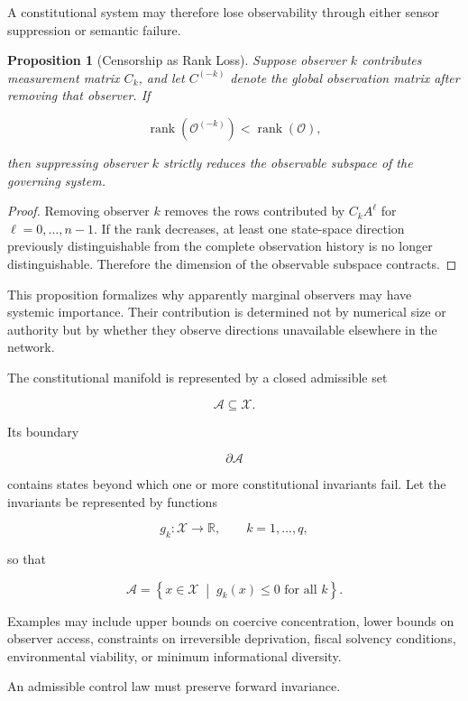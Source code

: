 \documentclass[12pt,a4paper]{article}
\newtheorem{proposition}{Proposition}
\DeclareMathOperator{\rank}{rank}
\begin{document}
A constitutional system may therefore lose observability through either sensor suppression or semantic failure.

\begin{proposition}[Censorship as Rank Loss]
Suppose observer \(k\) contributes measurement matrix \(C_k\), and let \(C^{(-k)}\) denote the global observation matrix after removing that observer. If

\[
\rank\left(\mathcal{O}^{(-k)}\right)
<
\rank\left(\mathcal{O}\right),
\]

then suppressing observer \(k\) strictly reduces the observable subspace of the governing system.
\end{proposition}

\begin{proof}
Removing observer \(k\) removes the rows contributed by \(C_kA^\ell\) for \(\ell=0,\dots,n-1\). If the rank decreases, at least one state-space direction previously distinguishable from the complete observation history is no longer distinguishable. Therefore the dimension of the observable subspace contracts.
\end{proof}

This proposition formalizes why apparently marginal observers may have systemic importance. Their contribution is determined not by numerical size or authority but by whether they observe directions unavailable elsewhere in the network.

The constitutional manifold is represented by a closed admissible set

\[
\mathcal{A}\subseteq\mathcal{X}.
\]

Its boundary

\[
\partial\mathcal{A}
\]

contains states beyond which one or more constitutional invariants fail. Let the invariants be represented by functions

\[
g_k:\mathcal{X}\rightarrow\mathbb{R},
\qquad
k=1,\dots,q,
\]

so that

\[
\mathcal{A}
=
\left\{
x\in\mathcal{X}
\;\middle|\;
g_k(x)\leq 0
\text{ for all }
k
\right\}.
\]

Examples may include upper bounds on coercive concentration, lower bounds on observer access, constraints on irreversible deprivation, fiscal solvency conditions, environmental viability, or minimum informational diversity.

An admissible control law must preserve forward invariance.
\end{document}
